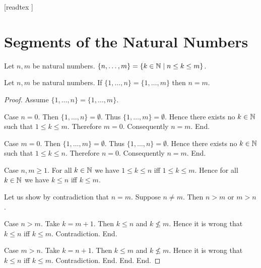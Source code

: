 \documentclass[10pt]{article}
\begin{document}
  \begin{imports}
    \begin{forthel}
      [readtex ]
    \end{forthel}
  \end{imports}


  \section*{Segments of the Natural Numbers}

  \begin{forthel}
    \begin{definition}
      Let $n, m$ be natural numbers.
      $\{ n, \dots, m \} = \{ k \in \mathbb{N} \mid n \leq k \leq m \}$.
    \end{definition}
  \end{forthel}

  \begin{forthel}
    \begin{proposition}
      Let $n, m$ be natural numbers.
      If $\{ 1, \dots, n \} = \{ 1, \dots, m \}$ then $n = m$.
    \end{proposition}
    \begin{proof}
      Assume $\{ 1, \dots, n \} = \{ 1, \dots, m \}$.

      Case $n = 0$.
        Then $\{ 1, \dots, n \} = \emptyset$.
        Thus $\{ 1, \dots, m \} = \emptyset$.
        Hence there exists no $k \in \mathbb{N}$ such that $1 \leq k \leq m$.
        Therefore $m = 0$.
        Consequently $n = m$.
      End.

      Case $m = 0$.
        Then $\{ 1, \dots, m \} = \emptyset$.
        Thus $\{ 1, \dots, n \} = \emptyset$.
        Hence there exists no $k \in \mathbb{N}$ such that $1 \leq k \leq n$.
        Therefore $n = 0$.
        Consequently $n = m$.
      End.

      Case $n, m \geq 1$.
        For all $k \in \mathbb{N}$ we have $1 \leq k \leq n$ iff $1 \leq k \leq m$.
        Hence for all $k \in \mathbb{N}$ we have $k \leq n$ iff $k \leq m$.

        Let us show by contradiction that $n = m$.
          Suppose $n \neq m$.
          Then $n > m$ or $m > n$.

          Case $n > m$.
            Take $k = m + 1$.
            Then $k \leq n$ and $k \nleq m$.
            Hence it is wrong that $k \leq n$ iff $k \leq m$.
            Contradiction.
          End.

          Case $m > n$.
            Take $k = n + 1$.
            Then $k \leq m$ and $k \nleq m$.
            Hence it is wrong that $k \leq n$ iff $k \leq m$.
            Contradiction.
          End.
        End.
      End.
    \end{proof}
  \end{forthel}
\end{document}
